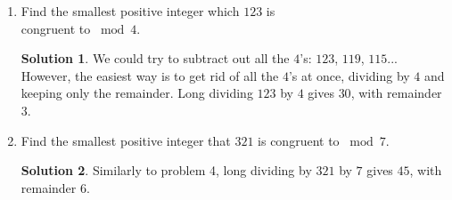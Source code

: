 \documentclass{article}
\theoremstyle{definition}
\newtheorem*{solution}{Solution}
\begin{document}
\begin{multicols}{2}
\begin{enumerate}
        \item Find the smallest positive integer which $123$ is \\ congruent to $\bmod 4$.
            \begin{solution}
                We could try to subtract out all the $4$'s: $123$, $119$, $115$... 
                However, the easiest way is to get rid of all the $4$'s at once, dividing by $4$ and keeping only the remainder. 
                Long dividing $123$ by $4$ gives $30$, with remainder $3$.
            \end{solution}
        \item Find the smallest positive integer that $321$ is congruent to $\bmod 7$.
            \begin{solution}
                Similarly to problem 4, long dividing by $321$ by $7$ gives $45$, with remainder $6$. 
            \end{solution}
    \end{enumerate}
\end{multicols}
\end{document}
